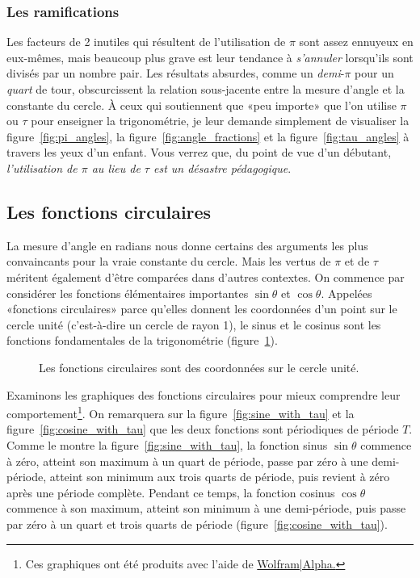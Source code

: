     \subsubsection{Les ramifications} %
    \label{sec:the_ramifications}


Les facteurs de 2 inutiles qui résultent de l'utilisation de $\pi$ sont assez
ennuyeux en eux-mêmes, mais beaucoup plus grave est leur tendance à
\emph{s'annuler} lorsqu'ils sont divisés par un nombre pair. Les résultats
absurdes, comme un \emph{demi}-$\pi$ pour un \emph{quart} de tour, obscurcissent
la relation sous-jacente entre la mesure d'angle et la constante du cercle. À
ceux qui soutiennent que «\ns peu importe\ns » que l'on utilise $\pi$ ou $\tau$ pour
enseigner la trigonométrie, je leur demande simplement de visualiser la
figure~\ref{fig:pi_angles}, la figure~\ref{fig:angle_fractions} et la
figure~\ref{fig:tau_angles} à travers les yeux d'un enfant. Vous verrez que, du
point de vue d'un débutant, \emph{l'utilisation de $\pi$ au lieu de $\tau$ est
un désastre pédagogique}.

  \subsection{Les fonctions circulaires} %
  \label{sec:the_circle_functions}

La mesure d'angle en radians nous donne certains des arguments les plus
convaincants pour la vraie constante du cercle. Mais les vertus de $\pi$ et de $\tau$
méritent également d'être comparées dans d'autres contextes. On commence par
considérer les fonctions élémentaires importantes $\sin\theta$ et $\cos\theta$.
Appelées «\ns fonctions circulaires\ns » parce qu'elles donnent les
coordonnées d'un point sur le cercle unité (c'est-à-dire un cercle de rayon 1),
le sinus et le cosinus sont les fonctions fondamentales de la trigonométrie
(figure~\ref{fig:circle_functions}).

\begin{figure}
\begin{center}
\end{center}
\caption{Les fonctions circulaires sont des coordonnées sur le cercle
unité.\label{fig:circle_functions}}
\end{figure}

Examinons les graphiques des fonctions circulaires pour mieux comprendre
leur comportement\footnote{Ces graphiques ont été produits avec l'aide de
\href{https://www.wolframalpha.com/}{Wolfram|Alpha.}}. On remarquera sur la
figure~\ref{fig:sine_with_tau} et la figure~\ref{fig:cosine_with_tau} que les
deux fonctions sont périodiques de période $T$. Comme le montre la
figure~\ref{fig:sine_with_tau}, la fonction sinus $\sin\theta$ commence à zéro,
atteint son maximum à un quart de période, passe par zéro à une demi-période,
atteint son minimum aux trois quarts de période, puis revient à zéro après une
période complète. Pendant ce temps, la fonction cosinus $\cos\theta$ commence à
son maximum, atteint son minimum à une demi-période, puis passe par zéro à un quart et
trois quarts de période (figure~\ref{fig:cosine_with_tau}).

